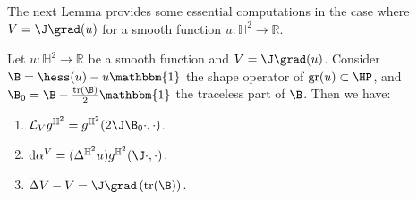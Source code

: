 The next Lemma provides some essential computations in the case where \(V = \J \grad(u) \) for a smooth function \(u : \mathbb{H}^2 \to \mathbb{R} \).
\begin{lemma}\label{Lie_derivative_of_Ju}
Let $u:\mathbb{H}^2\to\mathbb{R}$ be a smooth function and $V=\J\grad(u)$. Consider $\B=\hess(u)-u\mathbbm{1}$ the shape operator of $\mathrm{gr}(u)\subset\HP$, and $\B_0=\B-\frac{\mathrm{tr}(\B)}{2}\mathbbm{1}$ the traceless part of $\B$. Then we have:
\begin{enumerate}
\item \label{1Lie_derivative_of_Ju} $\mathcal{L}_Vg^{\mathbb{H}^2}=g^{\mathbb{H}^2}(2\J\B_0\cdot,\cdot)$.
\item \label{2Lie_derivative_of_Ju} $\mathrm{d}\alpha^V=(\Delta^{\mathbb{H}^2} u) g^{\mathbb{H}^2}(\J\cdot,\cdot)$.
\item \label{3Lie_derivative_of_Ju} $
\overline{\Delta}V-V=\J\grad\left(\mathrm{tr}(\B) \right)$.
\end{enumerate}
\end{lemma}

